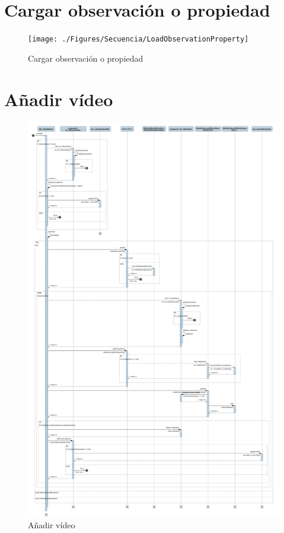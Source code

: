 \section{Cargar observaci\'on o propiedad}

\begin{figure}[H]
\centering
\texttt{[image: ./Figures/Secuencia/LoadObservationProperty]}
\caption{Cargar observaci\'on o propiedad}
\label{fig:LoadObservationProperty}
\end{figure}


\section{A\~nadir v\'ideo}
\begin{figure}[H]
\centering
\includegraphics[width=0.8\linewidth]{./Figures/Secuencia/AddVideo}
\caption{A\~nadir v\'ideo}
\label{fig:AddVideo}
\end{figure}

